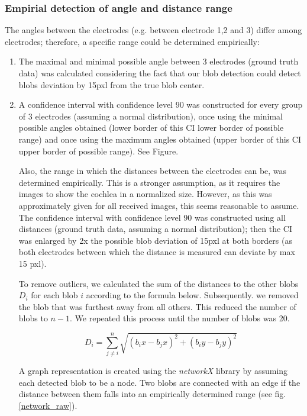 \documentclass[a4paper, 11pt]{article}
\begin{document}
\subsubsection{Empirial detection of angle and distance range}
The angles between the electrodes (e.g. between electrode 1,2 and 3) differ among electrodes; therefore, a specific range could be determined empirically: 
\begin{enumerate}
\item The maximal and minimal possible angle between 3 electrodes (ground truth data) was calculated considering the fact that our blob detection could detect blobs deviation by 15pxl from the true blob center. 
\item A confidence interval with confidence level 90 was constructed for every group of 3 electrodes (assuming a normal distribution), once using the minimal possible angles obtained (lower border of this CI \rightarrow lower border of possible range) and once using the maximum angles obtained (upper border of this CI \rightarrow upper border of possible range). See Figure.

Also, the range in which the distances between the electrodes can be, was determined empirically. This is a stronger assumption, as it requires the images to show the cochlea in a normalized size. However, as this was approximately given for all received images, this seems reasonable to assume. The confidence interval with confidence level 90 was constructed using all distances (ground truth data, assuming a normal distribution); then the CI was enlarged by 2x the possible blob deviation of 15pxl at both borders (as both electrodes between which the distance is measured can deviate by max 15 pxl). 


To remove outliers, we calculated the sum of the distances to the other blobs $D_{i}$ for each blob $i$ according to the formula below. Subsequently. we removed the blob that was furthest away from all others. This reduced the number of blobs to $n-1$. We repeated this process until the number of blobs was 20.

$$D_{i}=\sum_{j\neq i}^{n} \sqrt{(b_ix-b_jx)^2+(b_iy-b_jy)^2}$$

A graph representation is created using the \emph{networkX} library \cite{networkx} by assuming each detected blob to be a node. Two blobs are connected with an edge if the distance between them falls into an empirically determined range (see fig. \ref{network_raw}). %


\end{enumerate}
\end{document}
